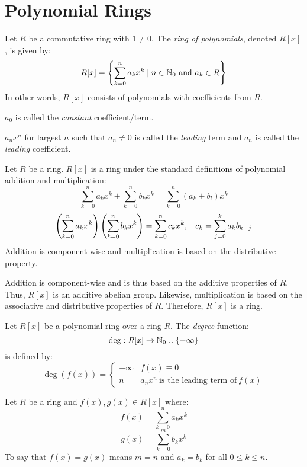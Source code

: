 \documentclass[letterpaper,12pt,fleqn]{article}
\begin{document}
\section*{Polynomial Rings}

\begin{definition}
  Let $R$ be a commutative ring with $1\ne0$. The \emph{ring of polynomials}, denoted
  $R[x]$, is given by:
  \[R[x]=\left\{\sum_{k=0}^na_kx^k\mid n\in\N_0\ \mbox{and}\ a_k\in R\right\}\]
  In other words, $R[x]$ consists of polynomials with coefficients from $R$.

  $a_0$ is called the \emph{constant} coefficient/term.

  $a_nx^n$ for largest $n$ such that $a_n\ne0$ is called the \emph{leading} term and
  $a_n$ is called the \emph{leading} coefficient.
\end{definition}

\begin{theorem}
  Let $R$ be a ring. $R[x]$ is a ring under the standard definitions of polynomial
  addition and multiplication:
  \[\sum_{k=0}^na_kx^k+\sum_{k=0}^nb_kx^k=\sum_{k=0}^n(a_k+b_l)x^k\]
  \[\left(\sum_{k=0}^na_kx^k\right)\left(\sum_{k=0}^nb_kx^k\right)=\sum_{k=0}^nc_kx^k,
  \hspace{2ex}c_k=\sum_{j=0}^ka_kb_{k-j}\]
  Addition is component-wise and multiplication is based on the distributive property.
\end{theorem}

\begin{theproof}
  Addition is component-wise and is thus based on the additive properties of $R$. Thus,
  $R[x]$ is an additive abelian group. Likewise, multiplication is based on the
  associative and distributive properties of $R$. Therefore, $R[x]$ is a ring.
\end{theproof}

\begin{definition}[Degree]
  Let $R[x]$ be a polynomial ring over a ring $R$. The \emph{degree} function:
  \[\deg:R[x]\to\mathbb{N}_0\cup\{-\infty\}\]
  is defined by:
  \[\deg(f(x))=\begin{cases}
  -\infty & f(x)\equiv0 \\
  n & a_nx^n\ \mbox{is the leading term of}\ f(x)
  \end{cases}\]
\end{definition}
\newpage
\begin{definition}[Equality]
  Let $R$ be a ring and $f(x),g(x)\in R[x]$ where:
  \[f(x)=\sum_{k=0}^na_kx^k\]
  \[g(x)=\sum_{k=0}^mb_kx^k\]
  To say that $f(x)=g(x)$ means $m=n$ and $a_k=b_k$ for all $0\le k\le n$.
\end{definition}
\end{document}
